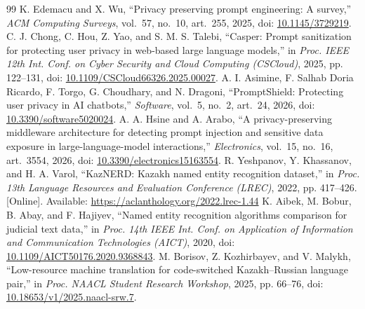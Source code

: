 \documentclass[12pt,a4paper]{article}
\newcommand{\doi}[1]{doi: \href{https://doi.org/#1}{#1}}
\begin{document}
\begin{thebibliography}{99}
 K. Edemacu and X. Wu, ``Privacy preserving prompt engineering: A survey,'' \emph{ACM Computing Surveys}, vol.~57, no.~10, art.~255, 2025, \doi{10.1145/3729219}.
 C. J. Chong, C. Hou, Z. Yao, and S. M. S. Talebi, ``Casper: Prompt sanitization for protecting user privacy in web-based large language models,'' in \emph{Proc. IEEE 12th Int. Conf. on Cyber Security and Cloud Computing (CSCloud)}, 2025, pp. 122--131, \doi{10.1109/CSCloud66326.2025.00027}.
 A. I. Asimine, F. Salhab Doria Ricardo, F. Torgo, G. Choudhary, and N. Dragoni, ``PromptShield: Protecting user privacy in AI chatbots,'' \emph{Software}, vol.~5, no.~2, art.~24, 2026, \doi{10.3390/software5020024}.
 A. A. Hsine and A. Arabo, ``A privacy-preserving middleware architecture for detecting prompt injection and sensitive data exposure in large-language-model interactions,'' \emph{Electronics}, vol.~15, no.~16, art.~3554, 2026, \doi{10.3390/electronics15163554}.
 R. Yeshpanov, Y. Khassanov, and H. A. Varol, ``KazNERD: Kazakh named entity recognition dataset,'' in \emph{Proc. 13th Language Resources and Evaluation Conference (LREC)}, 2022, pp. 417--426. [Online]. Available: \url{https://aclanthology.org/2022.lrec-1.44}
 K. Aibek, M. Bobur, B. Abay, and F. Hajiyev, ``Named entity recognition algorithms comparison for judicial text data,'' in \emph{Proc. 14th IEEE Int. Conf. on Application of Information and Communication Technologies (AICT)}, 2020, \doi{10.1109/AICT50176.2020.9368843}.
 M. Borisov, Z. Kozhirbayev, and V. Malykh, ``Low-resource machine translation for code-switched Kazakh--Russian language pair,'' in \emph{Proc. NAACL Student Research Workshop}, 2025, pp. 66--76, \doi{10.18653/v1/2025.naacl-srw.7}.
\end{thebibliography}
\end{document}
